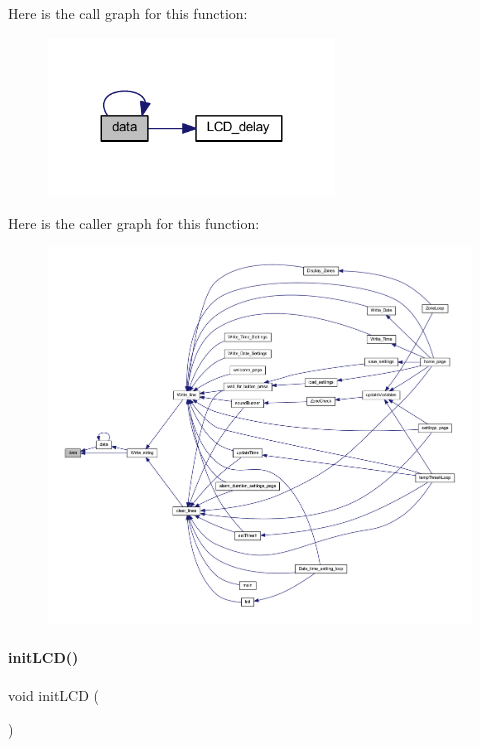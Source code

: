 Here is the call graph for this function\+:
\nopagebreak
\begin{figure}[H]
\begin{center}
\leavevmode
\includegraphics[width=215pt]{a00032_a54955197a7b52d9a202b75527f68cc08_cgraph}
\end{center}
\end{figure}
Here is the caller graph for this function\+:
\nopagebreak
\begin{figure}[H]
\begin{center}
\leavevmode
\includegraphics[width=350pt]{a00032_a54955197a7b52d9a202b75527f68cc08_icgraph}
\end{center}
\end{figure}
\mbox{\label{a00032_a08529d00f32f8441dc7669b1a1d3783c}} 
\paragraph{init\+L\+C\+D()}
{\footnotesize\ttfamily void init\+L\+CD (\begin{DoxyParamCaption}{ }\end{DoxyParamCaption})}

